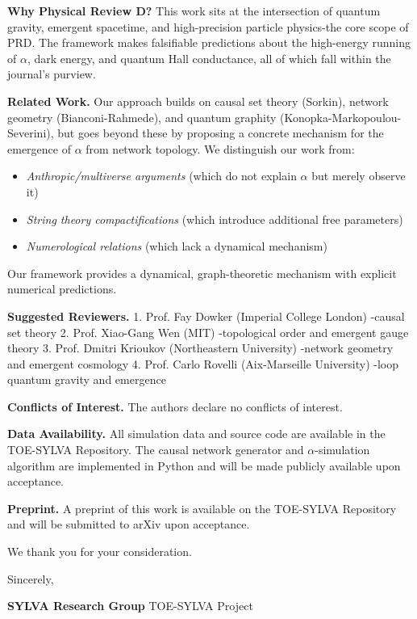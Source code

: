 \documentclass[11pt,a4paper]{article}
\theoremstyle{plain}
\theoremstyle{definition}
\begin{document}
\textbf{Why Physical Review D?} This work sits at the intersection of quantum gravity, emergent spacetime, and high-precision particle physics-the core scope of PRD. The framework makes falsifiable predictions about the high-energy running of $\alpha$, dark energy, and quantum Hall conductance, all of which fall within the journal's purview.

\textbf{Related Work.} Our approach builds on causal set theory (Sorkin), network geometry (Bianconi-Rahmede), and quantum graphity (Konopka-Markopoulou-Severini), but goes beyond these by proposing a concrete mechanism for the emergence of $\alpha$ from network topology. We distinguish our work from:
\begin{itemize}
\item \textit{Anthropic/multiverse arguments} (which do not explain $\alpha$ but merely observe it)
\item \textit{String theory compactifications} (which introduce additional free parameters)
\item \textit{Numerological relations} (which lack a dynamical mechanism)

\end{itemize}
Our framework provides a dynamical, graph-theoretic mechanism with explicit numerical predictions.

\textbf{Suggested Reviewers.}
1. Prof. Fay Dowker (Imperial College London) -causal set theory
2. Prof. Xiao-Gang Wen (MIT) -topological order and emergent gauge theory
3. Prof. Dmitri Krioukov (Northeastern University) -network geometry and emergent cosmology
4. Prof. Carlo Rovelli (Aix-Marseille University) -loop quantum gravity and emergence

\textbf{Conflicts of Interest.} The authors declare no conflicts of interest.

\textbf{Data Availability.} All simulation data and source code are available in the TOE-SYLVA Repository. The causal network generator and $\alpha$-simulation algorithm are implemented in Python and will be made publicly available upon acceptance.

\textbf{Preprint.} A preprint of this work is available on the TOE-SYLVA Repository and will be submitted to arXiv upon acceptance.

We thank you for your consideration.

Sincerely,

\textbf{SYLVA Research Group}
TOE-SYLVA Project

\textemdash{}
\end{document}
